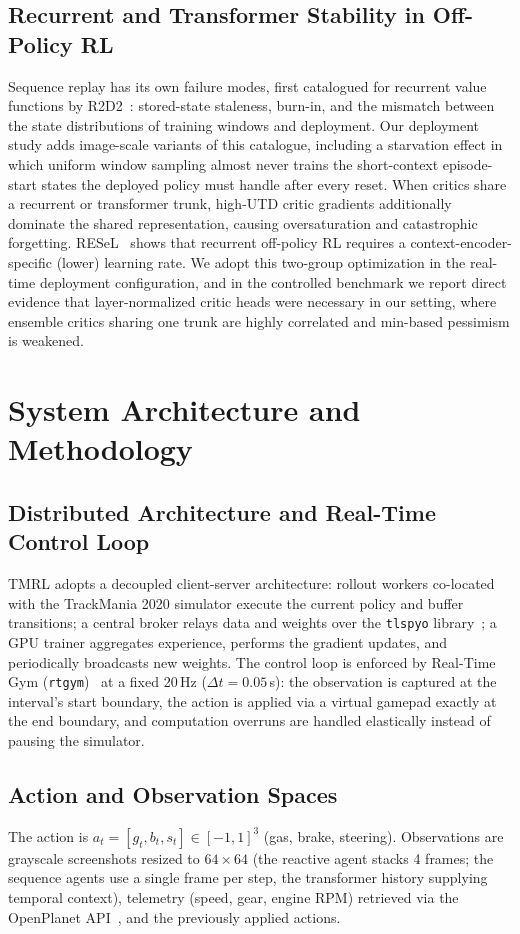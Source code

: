 \documentclass[conference]{IEEEtran}
\begin{document}
\subsection{Recurrent and Transformer Stability in Off-Policy RL}
Sequence replay has its own failure modes, first catalogued for recurrent value functions by R2D2~\cite{r2d2}: stored-state staleness, burn-in, and the mismatch between the state distributions of training windows and deployment. Our deployment study adds image-scale variants of this catalogue, including a starvation effect in which uniform window sampling almost never trains the short-context episode-start states the deployed policy must handle after every reset. When critics share a recurrent or transformer trunk, high-UTD critic gradients additionally dominate the shared representation, causing oversaturation and catastrophic forgetting. RESeL~\cite{resel} shows that recurrent off-policy RL requires a context-encoder-specific (lower) learning rate. We adopt this two-group optimization in the real-time deployment configuration, and in the controlled benchmark we report direct evidence that layer-normalized critic heads were necessary in our setting, where ensemble critics sharing one trunk are highly correlated and min-based pessimism is weakened.

\section{System Architecture and Methodology}
\label{sec:methodology}

\subsection{Distributed Architecture and Real-Time Control Loop}
TMRL adopts a decoupled client-server architecture: rollout workers co-located with the TrackMania 2020 simulator execute the current policy and buffer transitions; a central broker relays data and weights over the \texttt{tlspyo} library~\cite{tlspyo}; a GPU trainer aggregates experience, performs the gradient updates, and periodically broadcasts new weights. The control loop is enforced by Real-Time Gym (\texttt{rtgym})~\cite{rtgym} at a fixed 20\,Hz ($\Delta t = 0.05$\,s): the observation is captured at the interval's start boundary, the action is applied via a virtual gamepad exactly at the end boundary, and computation overruns are handled elastically instead of pausing the simulator.

\subsection{Action and Observation Spaces}
The action is $a_t = [g_t, b_t, s_t] \in [-1, 1]^3$ (gas, brake, steering). Observations are grayscale screenshots resized to $64 \times 64$ (the reactive agent stacks 4 frames; the sequence agents use a single frame per step, the transformer history supplying temporal context), telemetry (speed, gear, engine RPM) retrieved via the OpenPlanet API~\cite{openplanet}, and the previously applied actions.
\end{document}
